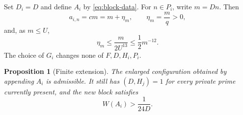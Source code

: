 \documentclass[11pt,reqno]{amsart}
\newtheorem{proposition}[theorem]{Proposition}
\theoremstyle{definition}
\theoremstyle{remark}
\numberwithin{equation}{section}
\begin{document}
Set $D_i=D$ and define $A_i$ by \eqref{eq:block-data}. For $n\in P_i$,
write $m=Dn$. Then
\begin{equation}\label{eq:eta}
 a_{i,n}=cm=m+\eta_m,\qquad
 \eta_m=\frac mq>0,
\end{equation}
and, as $m\leq U$,
\begin{equation}\label{eq:eta-small}
 \eta_m\leq\frac{m}{2U^{13}}\leq\frac12m^{-12}.
\end{equation}
The choice of $G_i$ changes none of $F,D,H_i,P_i$.

\begin{proposition}[Finite extension]\label{prop:extension}
The enlarged configuration obtained by appending $A_i$ is admissible.
It still has $(D,H_j)=1$ for every private prime currently present, and
the new block satisfies
\begin{equation}\label{eq:block-weight}
 W(A_i)>\frac1{24D}.
\end{equation}
\end{proposition}
\end{document}
